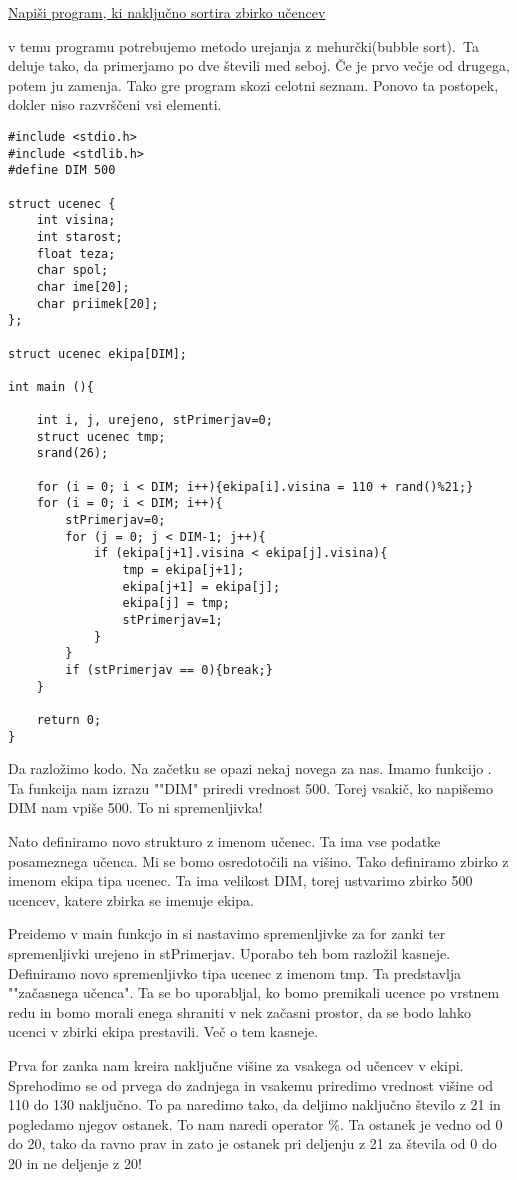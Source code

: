 \documentclass[a4paper, 12pt]{article}
\begin{document}
\underline{Napiši program, ki naključno sortira zbirko učencev}

v temu programu potrebujemo metodo urejanja z mehurčki(bubble sort).\
Ta deluje tako, da primerjamo po dve števili med seboj. Če je prvo večje od drugega, potem ju zamenja. Tako gre program skozi celotni seznam. Ponovo ta postopek, dokler niso razvrščeni vsi elementi.

\begin{lstlisting}
#include <stdio.h>
#include <stdlib.h>
#define DIM 500

struct ucenec {
	int visina;
	int starost;
	float teza;
	char spol;
	char ime[20];
	char priimek[20];
};

struct ucenec ekipa[DIM];

int main (){

	int i, j, urejeno, stPrimerjav=0;
	struct ucenec tmp;
	srand(26);
	
	for (i = 0; i < DIM; i++){ekipa[i].visina = 110 + rand()%21;}
	for (i = 0; i < DIM; i++){
		stPrimerjav=0;
		for (j = 0; j < DIM-1; j++){
			if (ekipa[j+1].visina < ekipa[j].visina){
				tmp = ekipa[j+1];
				ekipa[j+1] = ekipa[j];
				ekipa[j] = tmp;
				stPrimerjav=1;
			}
		}
		if (stPrimerjav == 0){break;}	
	}

	return 0;
}
\end{lstlisting}

Da razložimo kodo. Na začetku se opazi nekaj novega za nas. Imamo funkcijo . Ta funkcija nam izrazu ""DIM" priredi vrednost 500. Torej vsakič, ko napišemo DIM nam vpiše 500. To ni spremenljivka!\

Nato definiramo novo strukturo z imenom učenec. Ta ima vse podatke posameznega učenca. Mi se bomo osredotočili na višino. Tako definiramo zbirko z imenom ekipa tipa ucenec. Ta ima velikost DIM, torej ustvarimo zbirko 500 ucencev, katere zbirka se imenuje ekipa.\

Preidemo v main funkcjo in si nastavimo spremenljivke za for zanki ter spremenljivki urejeno in stPrimerjav. Uporabo teh bom razložil kasneje. Definiramo novo spremenljivko tipa ucenec z imenom tmp. Ta predstavlja ""začasnega učenca". Ta se bo uporabljal, ko bomo premikali ucence po vrstnem redu in bomo morali enega shraniti v nek začasni prostor, da se bodo lahko ucenci v zbirki ekipa prestavili. Več o tem kasneje.\

Prva for zanka nam kreira naključne višine za vsakega od učencev v ekipi. Sprehodimo se od prvega do zadnjega in vsakemu priredimo vrednost višine od 110 do 130 naključno. To pa naredimo tako, da deljimo naključno število z 21 in pogledamo njegov ostanek. To nam naredi operator \%. Ta ostanek je vedno od 0 do 20, tako da ravno prav in zato je ostanek pri deljenju z 21 za števila od 0 do 20 in ne deljenje z 20!\
\end{document}
